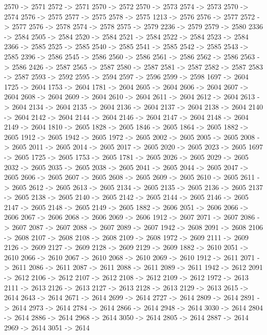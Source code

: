 {	2570 -> 2571
	2572 -> 2571
	2570 -> 2572
	2570 -> 2573
	2574 -> 2573
	2570 -> 2574
	2576 -> 2575
	2577 -> 2575
	2578 -> 2575
	1213 -> 2576
	2576 -> 2577
	2572 -> 2577
	2576 -> 2578
	2574 -> 2578
	2575 -> 2579
	2236 -> 2579
	2579 -> 2580
	2336 -> 2584
	2505 -> 2584
	2520 -> 2584
	2521 -> 2584
	2522 -> 2584
	2523 -> 2584
	2366 -> 2585
	2525 -> 2585
	2540 -> 2585
	2541 -> 2585
	2542 -> 2585
	2543 -> 2585
	2396 -> 2586
	2545 -> 2586
	2560 -> 2586
	2561 -> 2586
	2562 -> 2586
	2563 -> 2586
	2426 -> 2587
	2565 -> 2587
	2580 -> 2587
	2581 -> 2587
	2582 -> 2587
	2583 -> 2587
	2593 -> 2592
	2595 -> 2594
	2597 -> 2596
	2599 -> 2598
	1697 -> 2604
	1725 -> 2604
	1753 -> 2604
	1781 -> 2604
	2605 -> 2604
	2606 -> 2604
	2607 -> 2604
	2608 -> 2604
	2609 -> 2604
	2610 -> 2604
	2611 -> 2604
	2612 -> 2604
	2613 -> 2604
	2134 -> 2604
	2135 -> 2604
	2136 -> 2604
	2137 -> 2604
	2138 -> 2604
	2140 -> 2604
	2142 -> 2604
	2144 -> 2604
	2146 -> 2604
	2147 -> 2604
	2148 -> 2604
	2149 -> 2604
	1810 -> 2605
	1828 -> 2605
	1846 -> 2605
	1864 -> 2605
	1882 -> 2605
	1912 -> 2605
	1942 -> 2605
	1972 -> 2605
	2002 -> 2605
	2005 -> 2605
	2008 -> 2605
	2011 -> 2605
	2014 -> 2605
	2017 -> 2605
	2020 -> 2605
	2023 -> 2605
	1697 -> 2605
	1725 -> 2605
	1753 -> 2605
	1781 -> 2605
	2026 -> 2605
	2029 -> 2605
	2032 -> 2605
	2035 -> 2605
	2038 -> 2605
	2041 -> 2605
	2044 -> 2605
	2047 -> 2605
	2606 -> 2605
	2607 -> 2605
	2608 -> 2605
	2609 -> 2605
	2610 -> 2605
	2611 -> 2605
	2612 -> 2605
	2613 -> 2605
	2134 -> 2605
	2135 -> 2605
	2136 -> 2605
	2137 -> 2605
	2138 -> 2605
	2140 -> 2605
	2142 -> 2605
	2144 -> 2605
	2146 -> 2605
	2147 -> 2605
	2148 -> 2605
	2149 -> 2605
	1882 -> 2606
	2051 -> 2606
	2066 -> 2606
	2067 -> 2606
	2068 -> 2606
	2069 -> 2606
	1912 -> 2607
	2071 -> 2607
	2086 -> 2607
	2087 -> 2607
	2088 -> 2607
	2089 -> 2607
	1942 -> 2608
	2091 -> 2608
	2106 -> 2608
	2107 -> 2608
	2108 -> 2608
	2109 -> 2608
	1972 -> 2609
	2111 -> 2609
	2126 -> 2609
	2127 -> 2609
	2128 -> 2609
	2129 -> 2609
	1882 -> 2610
	2051 -> 2610
	2066 -> 2610
	2067 -> 2610
	2068 -> 2610
	2069 -> 2610
	1912 -> 2611
	2071 -> 2611
	2086 -> 2611
	2087 -> 2611
	2088 -> 2611
	2089 -> 2611
	1942 -> 2612
	2091 -> 2612
	2106 -> 2612
	2107 -> 2612
	2108 -> 2612
	2109 -> 2612
	1972 -> 2613
	2111 -> 2613
	2126 -> 2613
	2127 -> 2613
	2128 -> 2613
	2129 -> 2613
	2615 -> 2614
	2643 -> 2614
	2671 -> 2614
	2699 -> 2614
	2727 -> 2614
	2809 -> 2614
	2891 -> 2614
	2973 -> 2614
	2784 -> 2614
	2866 -> 2614
	2948 -> 2614
	3030 -> 2614
	2804 -> 2614
	2886 -> 2614
	2968 -> 2614
	3050 -> 2614
	2805 -> 2614
	2887 -> 2614
	2969 -> 2614
	3051 -> 2614
}
